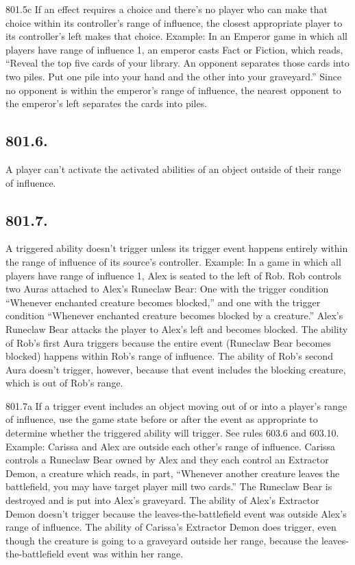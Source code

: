 801.5c If an effect requires a choice and there’s no player who can make that choice within its controller’s range of influence, the closest appropriate player to its controller’s left makes that choice.
Example: In an Emperor game in which all players have range of influence 1, an emperor casts Fact or Fiction, which reads, “Reveal the top five cards of your library. An opponent separates those cards into two piles. Put one pile into your hand and the other into your graveyard.” Since no opponent is within the emperor’s range of influence, the nearest opponent to the emperor’s left separates the cards into piles.

\subsection*{801.6.}
A player can’t activate the activated abilities of an object outside of their range of influence.

\subsection*{801.7.}
A triggered ability doesn’t trigger unless its trigger event happens entirely within the range of influence of its source’s controller.
Example: In a game in which all players have range of influence 1, Alex is seated to the left of Rob. Rob controls two Auras attached to Alex’s Runeclaw Bear: One with the trigger condition “Whenever enchanted creature becomes blocked,” and one with the trigger condition “Whenever enchanted creature becomes blocked by a creature.” Alex’s Runeclaw Bear attacks the player to Alex’s left and becomes blocked. The ability of Rob’s first Aura triggers because the entire event (Runeclaw Bear becomes blocked) happens within Rob’s range of influence. The ability of Rob’s second Aura doesn’t trigger, however, because that event includes the blocking creature, which is out of Rob’s range.

801.7a If a trigger event includes an object moving out of or into a player’s range of influence, use the game state before or after the event as appropriate to determine whether the triggered ability will trigger. See rules 603.6 and 603.10.
Example: Carissa and Alex are outside each other’s range of influence. Carissa controls a Runeclaw Bear owned by Alex and they each control an Extractor Demon, a creature which reads, in part, “Whenever another creature leaves the battlefield, you may have target player mill two cards.” The Runeclaw Bear is destroyed and is put into Alex’s graveyard. The ability of Alex’s Extractor Demon doesn’t trigger because the leaves-the-battlefield event was outside Alex’s range of influence. The ability of Carissa’s Extractor Demon does trigger, even though the creature is going to a graveyard outside her range, because the leaves-the-battlefield event was within her range.

